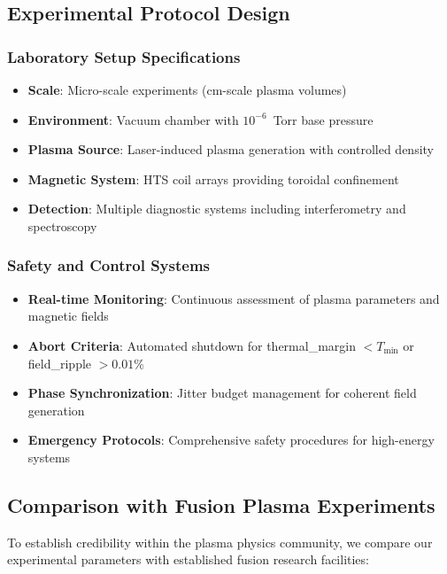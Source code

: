 \documentclass[10pt,twocolumn]{article}
\begin{document}
\subsection{Experimental Protocol Design}

\subsubsection{Laboratory Setup Specifications}
\begin{itemize}
\item \textbf{Scale}: Micro-scale experiments (cm-scale plasma volumes)
\item \textbf{Environment}: Vacuum chamber with $10^{-6}$~Torr base pressure
\item \textbf{Plasma Source}: Laser-induced plasma generation with controlled density
\item \textbf{Magnetic System}: HTS coil arrays providing toroidal confinement
\item \textbf{Detection}: Multiple diagnostic systems including interferometry and spectroscopy
\end{itemize}

\subsubsection{Safety and Control Systems}
\begin{itemize}
\item \textbf{Real-time Monitoring}: Continuous assessment of plasma parameters and magnetic fields
\item \textbf{Abort Criteria}: Automated shutdown for thermal\_margin $< T_{\min}$ or field\_ripple $> 0.01\%$
\item \textbf{Phase Synchronization}: Jitter budget management for coherent field generation
\item \textbf{Emergency Protocols}: Comprehensive safety procedures for high-energy systems
\end{itemize}

\subsection{Comparison with Fusion Plasma Experiments}

To establish credibility within the plasma physics community, we compare our experimental parameters with established fusion research facilities:
\end{document}
